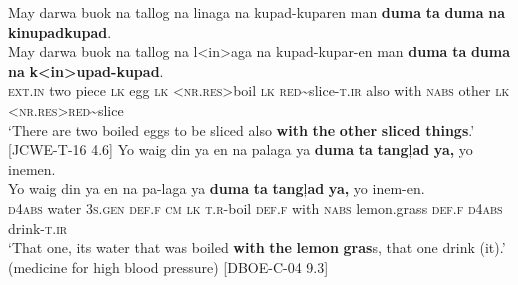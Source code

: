 \ea
May  darwa  buok  na  tallog  na  linaga  na  kupad-kuparen man  \textbf{duma}  \textbf{ta}  \textbf{duma}  \textbf{na}  \textbf{kinupadkupad}. \\\smallskip
 \gll May  darwa  buok  na  tallog  na  l<in>aga  na  kupad-{}kupar-en man  \textbf{duma}  \textbf{ta}  \textbf{duma}  \textbf{na}  \textbf{k<in>upad-kupad}. \\
\textsc{ext.in}  two  piece  \textsc{lk}  egg  \textsc{lk}  <\textsc{nr.res}>boil  \textsc{lk}  \textsc{red}\sim{}slice\textsc{-t.ir}
also  with  \textsc{nabs}  other  \textsc{lk}  <\textsc{nr.res}>\textsc{red}\sim{}slice \\
\glt `There are two boiled eggs to be sliced also \textbf{with} \textbf{the} \textbf{other} \textbf{sliced} \textbf{things}.’ [JCWE-T-16 4.6]
\z
\ea
Yo  waig  din  ya  en  na  palaga  ya  \textbf{duma}  \textbf{ta}  \textbf{tang}ļ\textbf{ad}  \textbf{ya,} yo  inemen. \\\smallskip
 \gll Yo  waig  din  ya  en  na  pa-laga  ya  \textbf{duma}  \textbf{ta}  \textbf{tang}ļ\textbf{ad}  \textbf{ya,} yo  inem-en. \\
\textsc{d}4\textsc{abs}  water  3\textsc{s.gen}  \textsc{def.f}  \textsc{cm}  \textsc{lk}  \textsc{t.r}-boil  \textsc{def.f}  with  \textsc{nabs}  lemon.grass  \textsc{def.f}
\textsc{d}4\textsc{abs}  drink-\textsc{t.ir} \\
\glt `That one, its water that was boiled \textbf{with} \textbf{the} \textbf{lemon} \textbf{gras}s, that one drink (it).’ (medicine for high blood pressure) [DBOE-C-04 9.3]
\z
